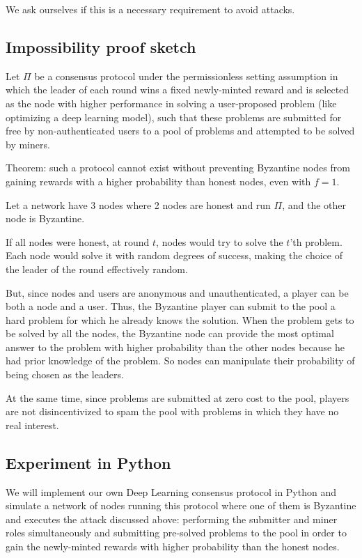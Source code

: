 \documentclass[conference]{IEEEtran}
\begin{document}
We ask ourselves if this is a necessary requirement to avoid attacks.

\subsection{Impossibility proof sketch}

Let $\Pi$ be a consensus protocol under the permissionless setting assumption in which the leader of each round wins a fixed newly-minted reward and is selected as the node with higher performance in solving a user-proposed problem (like optimizing a deep learning model), such that these problems are submitted for free by non-authenticated users to a pool of problems and attempted to be solved by miners.

Theorem: such a protocol cannot exist without preventing Byzantine nodes from gaining rewards with a higher probability than honest nodes, even with $f=1$.

Let a network have 3 nodes where 2 nodes are honest and run $\Pi$, and the other node is Byzantine.

If all nodes were honest, at round $t$, nodes would try to solve the $t$'th problem. Each node would solve it with random degrees of success, making the choice of the leader of the round effectively random.

But, since nodes and users are anonymous and unauthenticated, a player can be both a node and a user. Thus, the Byzantine player can submit to the pool a hard problem for which he already knows the solution. When the problem gets to be solved by all the nodes, the Byzantine node can provide the most optimal answer to the problem with higher probability than the other nodes because he had prior knowledge of the problem. So nodes can manipulate their probability of being chosen as the leaders.

At the same time, since problems are submitted at zero cost to the pool, players are not disincentivized to spam the pool with problems in which they have no real interest.

\subsection{Experiment in Python}

We will implement our own Deep Learning consensus protocol in Python and simulate a network of nodes running this protocol where one of them is Byzantine and executes the attack discussed above: performing the submitter and miner roles simultaneously and submitting pre-solved problems to the pool in order to gain the newly-minted rewards with higher probability than the honest nodes.
\end{document}
